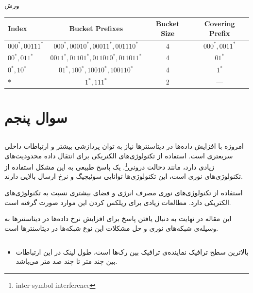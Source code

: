\documentclass[paper=a4, fontsize=11pt]{article}
\numberwithin{equation}{section} %
\numberwithin{figure}{section} %
\numberwithin{table}{section} %
\begin{document}
\par
ورش 

\begin{center}
\begin{latin}
\begin{tabular}{ l  c  c  c }
    \hline
    Index & Bucket Prefixes & Bucket Size & Covering Prefix \\
    \hline
    $000^*, 00111^*$ & $000^*, 00010^*, 00011^*, 001110^*$ & 4 & $000^*, 0011^*$ \\
    $00^*, 011^*$ & $0011^*, 01101^*, 011010^*, 011011^*$ & 4 & $01^*$ \\
    $0^*, 10^*$ & $01^*, 100^*, 10010^*, 100110^*$ & 4 & $1^*$ \\
    $*$ & $1^*, 111^*$ & 2 & --- \\
    \hline
\end{tabular}
\end{latin}
\end{center}

\section{سوال پنجم}
\subsection{}
\par
امروزه با افزایش داده‌ها در دیتاسنترها نیاز به توان پردازشی بیشتر و ارتباطات داخلی سریعتری است.
استفاده از تکنولوژی‌های الکتریکی برای انتقال داده محدودیت‌های زیادی دارد، مانند دخالت درونی\footnote{inter-symbol interference}.
یک پاسخ طبیعی به این مشکل استفاده از تکنولوژی‌های نوری است، این تکنولوژی‌ها توانایی سوئیچیگ و نرخ ارسال
بالایی دارند.

\par
استفاده از تکنولوژی‌های نوری مصرف انرژی و فضای بیشتری نسبت به تکنولوژی‌های الکتریکی دارد.
مطالعات زیادی برای ریلکس کردن این موارد صورت گرفته است.

\par
این مقاله در نهایت به دنبال یافتن پاسخ برای افزایش نرخ داده‌ها در دیتاسنترها به وسیله‌ی شبکه‌های نوری و
حل مشکلات این نوع شبکه‌ها در دیتاسنترها است.

\subsection{}
\begin{itemize}
\item
بالاترین سطح ترافیک نماینده‌ی ترافیک بین رک‌ها است،
طول لینک در این ارتباطات بین چند متر تا چند صد متر می‌باشد.
\end{itemize}
\end{document}
